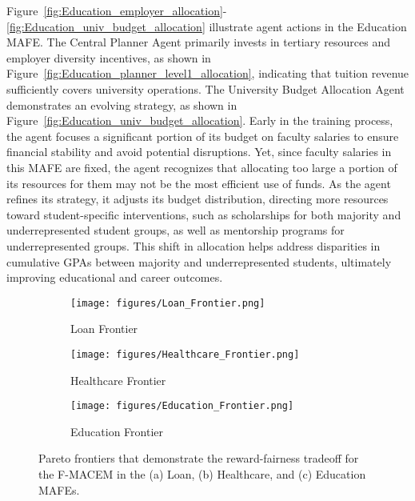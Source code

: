 Figure~\ref{fig:Education_employer_allocation}-\ref{fig:Education_univ_budget_allocation} illustrate agent actions in the Education MAFE. The Central Planner Agent primarily invests in tertiary resources and employer diversity incentives, as shown in Figure~\ref{fig:Education_planner_level1_allocation}, indicating that tuition revenue sufficiently covers university operations. The University Budget Allocation Agent demonstrates an evolving strategy, as shown in Figure~\ref{fig:Education_univ_budget_allocation}. Early in the training process, the agent focuses a significant portion of its budget on faculty salaries to ensure financial stability and avoid potential disruptions. Yet, since faculty salaries in this MAFE are fixed, the agent recognizes that allocating too large a portion of its resources for them may not be the most efficient use of funds. As the agent refines its strategy, it adjusts its budget distribution, directing more resources toward student-specific interventions, such as scholarships for both majority and underrepresented student groups, as well as mentorship programs for underrepresented groups. This shift in allocation helps address disparities in cumulative GPAs between majority and underrepresented students, ultimately improving educational and career outcomes.


\begin{figure*}[ht!]
  \begin{subfigure}{0.33\textwidth}
    \texttt{[image: figures/Loan\_Frontier.png]}
    \caption{Loan Frontier} \label{fig:loan_front}
  \end{subfigure}%
  \hspace*{\fill}   %
  \begin{subfigure}{0.33\textwidth}
    \texttt{[image: figures/Healthcare\_Frontier.png]}
    \caption{Healthcare Frontier} \label{fig:health_front}
  \end{subfigure}%
  \begin{subfigure}{0.33\textwidth}
    \texttt{[image: figures/Education\_Frontier.png]}
    \caption{Education Frontier} \label{fig:edu_frontier}
  \end{subfigure}%
\caption{Pareto frontiers that demonstrate the reward-fairness tradeoff for the F-MACEM in the (a) Loan, (b) Healthcare, and (c) Education MAFEs.} \label{fig:Frontiers}
\end{figure*}

